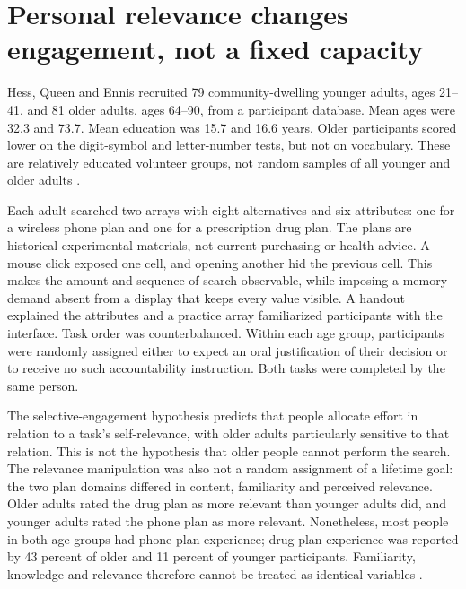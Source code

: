 \section{Personal relevance changes engagement, not a fixed capacity}
\label{sec:p19-aging-goals-search}

Hess, Queen and Ennis recruited 79 community-dwelling younger adults,
ages 21--41, and 81 older adults, ages 64--90, from a participant database.
Mean ages were 32.3 and 73.7. Mean education was 15.7 and 16.6 years.
Older participants scored lower on the digit-symbol and letter-number
tests, but not on vocabulary. These are relatively educated volunteer
groups, not random samples of all younger and older adults
\cite[pp.~705--706, table~1]{HessQueenEnnis2013Search}.

Each adult searched two arrays with eight alternatives and six attributes:
one for a wireless phone plan and one for a prescription drug plan. The
plans are historical experimental materials, not current purchasing or
health advice. A mouse click exposed one cell, and opening another hid the
previous cell. This makes the amount and sequence of search observable,
while imposing a memory demand absent from a display that keeps every
value visible. A handout explained the attributes and a practice array
familiarized participants with the interface. Task order was counterbalanced.
Within each age group, participants were randomly assigned either to
expect an oral justification of their decision or to receive no such
accountability instruction. Both tasks were completed by the same person.

The selective-engagement hypothesis predicts that people allocate effort
in relation to a task's self-relevance, with older adults particularly
sensitive to that relation. This is not the hypothesis that older people
cannot perform the search. The relevance manipulation was also not a
random assignment of a lifetime goal: the two plan domains differed in
content, familiarity and perceived relevance. Older adults rated the drug
plan as more relevant than younger adults did, and younger adults rated
the phone plan as more relevant. Nonetheless, most people in both age
groups had phone-plan experience; drug-plan experience was reported by
43 percent of older and 11 percent of younger participants. Familiarity,
knowledge and relevance therefore cannot be treated as identical variables
\cite[pp.~705--706]{HessQueenEnnis2013Search}.

